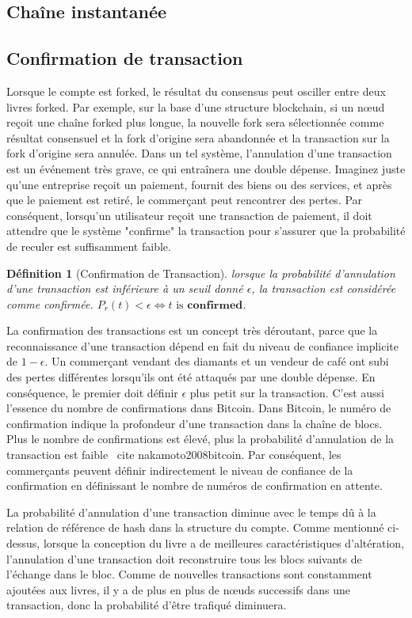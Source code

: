 \documentclass[UTF8,nofonts]{article}
\newtheorem{definition}{Définition}[section]
\begin{document}
\begin{multicols}{2}
\section{Chaîne instantanée}
\subsection{Confirmation de transaction}
Lorsque le compte est forked, le résultat du consensus peut osciller entre deux livres forked. Par exemple, sur la base d'une structure blockchain, si un nœud reçoit une chaîne forked plus longue, la nouvelle fork sera sélectionnée comme résultat consensuel et la fork d'origine sera abandonnée et la transaction sur la fork d'origine sera annulée. Dans un tel système, l'annulation d'une transaction est un événement très grave, ce qui entraînera une double dépense. Imaginez juste qu'une entreprise reçoit un paiement, fournit des biens ou des services, et après que le paiement est retiré, le commerçant peut rencontrer des pertes. Par conséquent, lorsqu'un utilisateur reçoit une transaction de paiement, il doit attendre que le système "confirme" la transaction pour s'assurer que la probabilité de reculer est suffisamment faible.

\begin{definition}[Confirmation de Transaction]
lorsque la probabilité d'annulation d'une transaction est inférieure à un seuil donné $\epsilon$, la transaction est considérée comme confirmée.
$P_{r}(t) < \epsilon \Leftrightarrow t \text{ is } \boldsymbol{confirmed}$.
\end{definition}


La confirmation des transactions est un concept très déroutant, parce que la reconnaissance d'une transaction dépend en fait du niveau de confiance implicite de $1-\epsilon$. Un commerçant vendant des diamants et un vendeur de café ont subi des pertes différentes lorsqu'ils ont été attaqués par une double dépense. En conséquence, le premier doit définir $\epsilon$ plus petit sur la transaction. C'est aussi l'essence du nombre de confirmations dans Bitcoin. Dans Bitcoin, le numéro de confirmation indique la profondeur d'une transaction dans la chaîne de blocs. Plus le nombre de confirmations est élevé, plus la probabilité d'annulation de la transaction est faible \ cite {nakamoto2008bitcoin}. Par conséquent, les commerçants peuvent définir indirectement le niveau de confiance de la confirmation en définissant le nombre de numéros de confirmation en attente.


La probabilité d'annulation d'une transaction diminue avec le temps dû à la relation de référence de hash dans la structure du compte. Comme mentionné ci-dessus, lorsque la conception du livre a de meilleures caractéristiques d'altération, l'annulation d'une transaction doit reconstruire tous les blocs suivants de l'échange dans le bloc. Comme de nouvelles transactions sont constamment ajoutées aux livres, il y a de plus en plus de nœuds successifs dans une transaction, donc la probabilité d'être trafiqué diminuera. 


\end{multicols}
\end{document}
